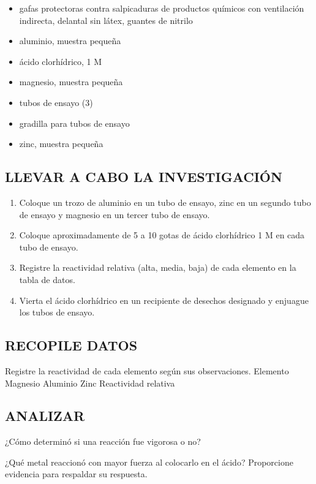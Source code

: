 \documentclass[a4paper,11pt]{exam}
\begin{document}
\begin{itemize}

    \item gafas protectoras contra salpicaduras de productos químicos con ventilación indirecta, delantal sin látex, guantes de nitrilo

    \item aluminio, muestra pequeña 

    \item  ácido clorhídrico, 1 M
\item  magnesio, muestra pequeña
\item  tubos de ensayo (3)
\item  gradilla para tubos de ensayo
\item  zinc, muestra pequeña
 
\end{itemize}


\subsection*{LLEVAR A CABO LA INVESTIGACIÓN}

\begin{enumerate}
    


    \item Coloque un trozo de aluminio en un tubo de ensayo, zinc en un segundo tubo de ensayo y magnesio en un
tercer tubo de ensayo.
\item Coloque aproximadamente de 5 a 10 gotas de ácido clorhídrico 1 M en cada tubo de ensayo.
\item Registre la reactividad relativa (alta, media, baja) de cada elemento en la tabla de datos.
\item Vierta el ácido clorhídrico en un recipiente de desechos designado y enjuague los tubos de ensayo.

\end{enumerate}

\subsection*{RECOPILE DATOS}

Registre la reactividad de cada elemento según sus observaciones.
Elemento Magnesio Aluminio Zinc
Reactividad relativa

\subsection*{ANALIZAR}

\begin{questions}



\question ¿Cómo determinó si una reacción fue vigorosa o no?

\fillwithlines{1in}


\question ¿Qué metal reaccionó con mayor fuerza al colocarlo en el ácido? Proporcione evidencia para respaldar su respuesta.

\fillwithlines{1in}

\end{questions}
\end{document}
